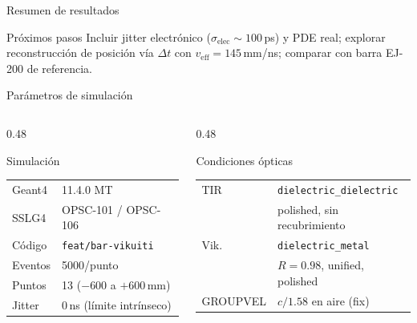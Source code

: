 \documentclass[aspectratio=169,10pt]{beamer}
\begin{document}
\begin{frame}{Resumen de resultados}
\vspace{0.3em}
\begin{block}{\footnotesize Próximos pasos}
  \footnotesize
  Incluir jitter electrónico ($\sigma_\text{elec}\sim100$\,ps) y PDE real;
  explorar reconstrucción de posición vía $\Delta t$ con $v_\text{eff}=145$\,mm/ns;
  comparar con barra EJ-200 de referencia.
\end{block}

\end{frame}

\begin{frame}{Parámetros de simulación}
\footnotesize
\begin{columns}[T]
  \begin{column}{0.48\textwidth}
  \begin{block}{Simulación}
    \begin{tabular}{@{}ll@{}}
      Geant4 & 11.4.0 MT \\
      SSLG4 & OPSC-101 / OPSC-106 \\
      Código & \texttt{feat/bar-vikuiti} \\
      Eventos & 5000/punto \\
      Puntos & 13 ($-600$ a $+600$\,mm) \\
      Jitter & 0\,ns (límite intrínseco) \\
    \end{tabular}
  \end{block}
  \end{column}

  \begin{column}{0.48\textwidth}
  \begin{block}{Condiciones ópticas}
    \begin{tabular}{@{}ll@{}}
      TIR  & \texttt{dielectric\_dielectric}\\
           & polished, sin recubrimiento \\
      Vik. & \texttt{dielectric\_metal} \\
           & $R=0.98$, unified, polished \\
      GROUPVEL & $c/1.58$ en aire (fix) \\
    \end{tabular}
  \end{block}
  \end{column}
\end{columns}
\end{frame}
\end{document}
